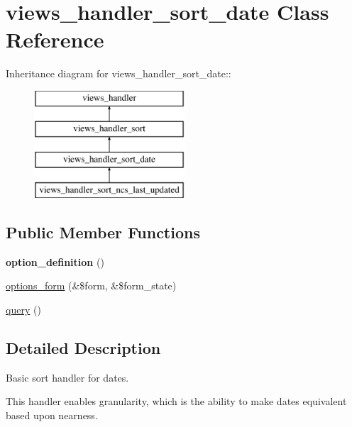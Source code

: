 \hypertarget{classviews__handler__sort__date}{
\section{views\_\-handler\_\-sort\_\-date Class Reference}
\label{classviews__handler__sort__date}
}
Inheritance diagram for views\_\-handler\_\-sort\_\-date::\begin{figure}[H]
\begin{center}
\leavevmode
\includegraphics[height=4cm]{classviews__handler__sort__date}
\end{center}
\end{figure}
\subsection*{Public Member Functions}
\begin{DoxyCompactItemize}
\item 
\hypertarget{classviews__handler__sort__date_ae46b66b6623fc747b821664b60c98b10}{
{\bfseries option\_\-definition} ()}
\label{classviews__handler__sort__date_ae46b66b6623fc747b821664b60c98b10}

\item 
\hyperlink{classviews__handler__sort__date_a622c39d35c93e620cc6fa6ae2ab37ab4}{options\_\-form} (\&\$form, \&\$form\_\-state)
\item 
\hyperlink{classviews__handler__sort__date_a3d3680d96fee82a746bac50c051016a8}{query} ()
\end{DoxyCompactItemize}


\subsection{Detailed Description}
Basic sort handler for dates.

This handler enables granularity, which is the ability to make dates equivalent based upon nearness. 

